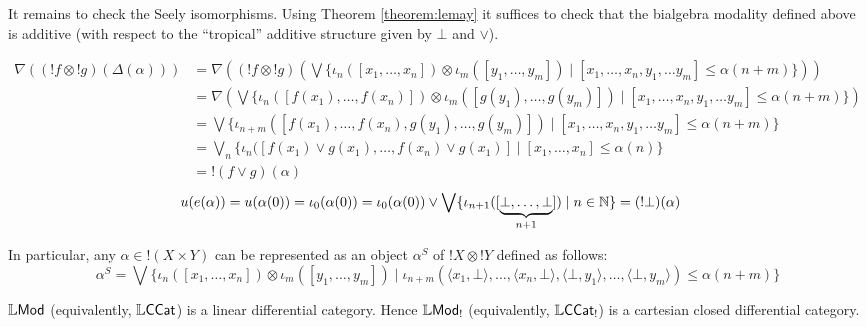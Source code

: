 It remains to check the Seely isomorphisms.
Using Theorem \ref{theorem:lemay} it suffices to check that the bialgebra modality defined above is additive (with respect to the ``tropical'' additive structure given by $\bot$ and $\vee$).

{\tiny
\begin{align*}
\nabla((!f\otimes !g)(\Delta(\alpha))) & =
\nabla\left((!f\otimes !g)\left(
\bigvee\{\iota_{n}([x_{1},\dots, x_{n}])\otimes \iota_{m}([y_{1},\dots, y_{m}])\mid [x_{1},\dots, x_{n},y_{1},\dots y_{m}]\leq \alpha(n+m)\}
\right)\right)\\
&=
\nabla\left(
\bigvee\{\iota_{n}([f(x_{1}),\dots, f(x_{n})])\otimes \iota_{m}([g(y_{1}),\dots, g(y_{m})])\mid [x_{1},\dots, x_{n},y_{1},\dots y_{m}]\leq \alpha(n+m)\}
\right)\\
&=
\bigvee\{\iota_{n+m}([f(x_{1}),\dots, f(x_{n}),g(y_{1}),\dots, g(y_{m})])\mid [x_{1},\dots, x_{n},y_{1},\dots y_{m}]\leq \alpha(n+m)\}\\
&=
\bigvee_{n}\{ \iota_{n}([f(x_{1})\vee g(x_{1}),\dots, f(x_{n})\vee g(x_{1})]
\mid [x_{1},\dots, x_{n}]\leq \alpha(n)\}\\
&=
!(f\vee g)(\alpha)
\end{align*}
}
\begin{align*}
u(e(\alpha)) = u(\alpha(0))& =\iota_{0}(\alpha({0})) =
\iota_{0}(\alpha(0))\vee
\bigvee\{\iota_{n+1}([\underbrace{\bot,\dots, \bot}_{n+1}])\mid n\in \mathbb{N} \}=
(!\bot) (\alpha)
\end{align*}

In particular, any $\alpha\in !(X\times Y)$ can be represented 
as an object $\alpha^{S}$ of $!X\otimes !Y$ defined as follows:
$$
\alpha^{S}=\bigvee \{ \iota_{n}([x_{1},\dots, x_{n}])\otimes \iota_{m}([y_{1},\dots, y_{m}]) \mid
\iota_{n+m}(\langle x_{1},\bot\rangle,\dots, 
\langle x_{n},\bot\rangle,
\langle \bot, y_{1}\rangle, \dots,
\langle \bot, y_{m}\rangle) \leq \alpha(n+m)
\}
$$


\begin{theorem}
$\mathbb{L}\mathsf{Mod}$ (equivalently, $\mathbb{L}\mathsf{CCat}$) is a linear differential category. Hence $\mathbb{L}\mathsf{Mod}_{!}$ (equivalently, $\mathbb{L}\mathsf{CCat}_{!}$) is a cartesian closed differential category. 
\end{theorem}
%

